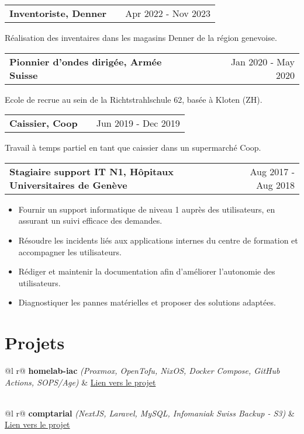 \documentclass[a4paper,11pt]{article}
\makeatletter
\newenvironment{jobshort}[2]
    {
    \begin{tabularx}{\linewidth}{@{}l X r@{}}
    \textbf{#1} & \hfill &  #2 \\[3.75pt]
    \end{tabularx}
    }
    {
    }
\newenvironment{joblong}[2]
    {
    \begin{tabularx}{\linewidth}{@{}l X r@{}}
    \textbf{#1} & \hfill &  #2 \\[3.75pt]
    \end{tabularx}
    \begin{minipage}[t]{\linewidth}
    \begin{itemize}[nosep,after=\strut, leftmargin=1em, itemsep=3pt,label=--]
    }
    {
    \end{itemize}
    \end{minipage}
    }
\makeatother
\begin{document}
\begin{jobshort}{Inventoriste, Denner}{Apr 2022 - Nov 2023}
    Réalisation des inventaires dans les magasins Denner de la région genevoise.
\end{jobshort}

\begin{jobshort}{Pionnier d’ondes dirigée, Armée Suisse}{Jan 2020 - May 2020}
    Ecole de recrue au sein de la Richtstrahlschule 62, basée à Kloten (ZH).
\end{jobshort}

\begin{jobshort}{Caissier, Coop}{Jun 2019 - Dec 2019}
    Travail à temps partiel en tant que caissier dans un supermarché Coop.
\end{jobshort}

\begin{joblong}{Stagiaire support IT N1, Hôpitaux Universitaires de Genève}{Aug 2017 - Aug 2018}
\item Fournir un support informatique de niveau 1 auprès des utilisateurs, en assurant un suivi efficace des demandes.
\item Résoudre les incidents liés aux applications internes du centre de formation et accompagner les utilisateurs.
\item Rédiger et maintenir la documentation afin d’améliorer l’autonomie des utilisateurs.
\item Diagnostiquer les pannes matérielles et proposer des solutions adaptées.
\end{joblong}

\section{Projets}

\begin{tabularx}{\linewidth}{ @{}l r@{} }
\textbf{homelab-iac} \textit{(Proxmox, OpenTofu, NixOS, Docker Compose, GitHub Actions, SOPS/Age)} & \hfill \href{https://boranuzun.github.io/homelab-docs}{Lien vers le projet} \\[3.75pt]
  \\
\end{tabularx}

\begin{tabularx}{\linewidth}{ @{}l r@{} }
\textbf{comptarial} \textit{(NextJS, Laravel, MySQL, Infomaniak Swiss Backup - S3)} & \hfill \href{https://github.com/heg-comptarial/comptarial}{Lien vers le projet} \\[3.75pt]
  \\
\end{tabularx}
\end{document}
